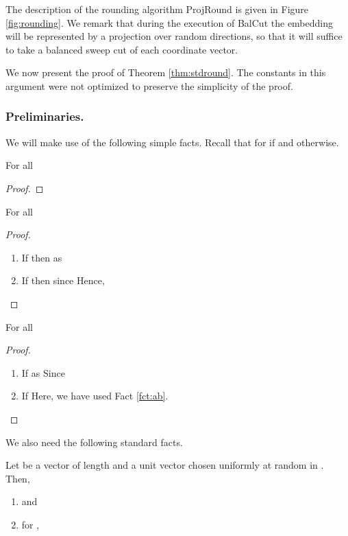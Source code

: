 \documentclass[twoside,leqno,twocolumn]{article}
\numberwithin{equation}{section}
\newcommand{\alg}{{\sc BalCut}\xspace}
\begin{document}
The description of the rounding algorithm {\sc ProjRound} is given in Figure \ref{fig:rounding}. We remark that during the execution of \alg the embedding  will be represented by a projection over  random directions, so that it will suffice to take a balanced sweep cut of each coordinate vector.

We now present  the proof of Theorem \ref{thm:stdround}. 
The constants in this argument were not optimized to preserve the simplicity of the proof.

\subsubsection{Preliminaries.} We will make use of the following simple facts. Recall that for   if  and  otherwise.



\begin{fact}\label{fct:ab}
For all   \end{fact}
\begin{proof}
 
\end{proof}

\begin{fact}\label{fct:abs}
For all   \end{fact}
\begin{proof} 

\begin{enumerate}
\item If  then   as 
\item If  then since   
Hence, 
\end{enumerate}
\end{proof}

\begin{fact}\label{fct:ab2}
For all   \end{fact}
\begin{proof} 

\begin{enumerate}
\item If    as  Since   
\item If   Here, we have used Fact \ref{fct:ab}. 
\end{enumerate}
\end{proof}



We also need the following standard facts.
\begin{fact}\label{fct:prob}
Let  be a vector of length  and  a unit vector chosen uniformly at random in . Then,
\begin{enumerate}
\item  and 
\item  for ,

\end{enumerate}
\end{fact}
\end{document}
